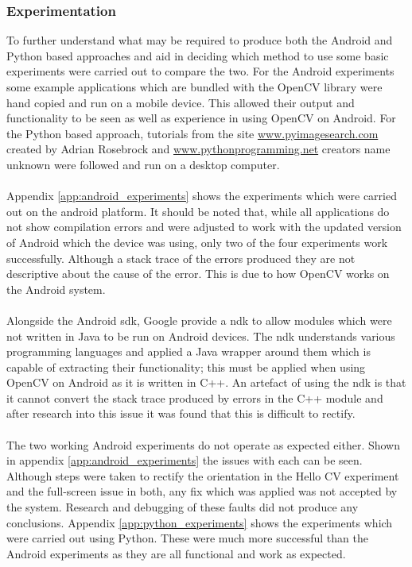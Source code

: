 	\subsubsection{Experimentation}
		To further understand what may be required to produce both the Android and Python based approaches and aid in deciding which method to use some basic experiments were carried out to compare the two. For the Android experiments some example applications which are bundled with the OpenCV library were hand copied and run on a mobile device. This allowed their output and functionality to be seen as well as experience in using OpenCV on Android. For the Python based approach, tutorials from the site \url{www.pyimagesearch.com} created by Adrian Rosebrock and \url{www.pythonprogramming.net} creators name unknown were followed and run on a desktop computer.
		\\\\
		Appendix \ref{app:android_experiments} shows the experiments which were carried out on the android platform. It should be noted that, while all applications do not show compilation errors and were adjusted to work with the updated version of Android which the device was using, only two of the four experiments work successfully. Although a stack trace of the errors produced they are not descriptive about the cause of the error. This is due to how OpenCV works on the Android system.
		\\\\
		Alongside the Android \gls{sdk}, Google provide a \gls{ndk} to allow modules which were not written in Java to be run on Android devices. The \gls{ndk} understands various programming languages and applied a Java wrapper around them which is capable of extracting their functionality; this must be applied when using OpenCV on Android as it is written in C++. An artefact of using the \gls{ndk} is that it cannot convert the stack trace produced by errors in the C++ module and after research into this issue it was found that this is difficult to rectify.
		\\\\
		The two working Android experiments do not operate as expected either. Shown in appendix \ref{app:android_experiments} the issues with each can be seen. Although steps were taken to rectify the orientation in the Hello CV experiment and the full-screen issue in both, any fix which was applied was not accepted by the system. Research and debugging of these faults did not produce any conclusions. Appendix \ref{app:python_experiments} shows the experiments which were carried out using Python. These were much more successful than the Android experiments as they are all functional and work as expected.
